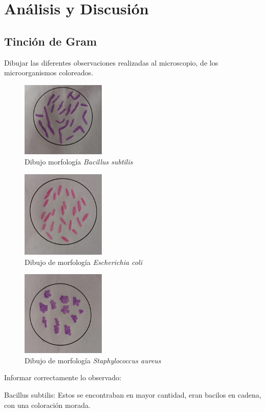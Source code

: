 \documentclass[journal,transmag]{IEEEtran}
\begin{document}
\section{Análisis y Discusión}
\subsection{\textbf{Tinción de Gram}}
 Dibujar las diferentes observaciones realizadas al microscopio, de los microorganismos coloreados. 
 	\begin{figure}[!h] 
	\center 
	\includegraphics[width=4cm]{I27.png} 
	\caption{Dibujo morfología \textit{Bacillus subtilis} } 
	\label{I1}
	\end{figure} 
	\begin{figure}[!h] 
	\center 
	\includegraphics[width=4cm]{I28.png} 
	\caption{Dibujo de morfología \textit{Escherichia coli}} 
	\label{I1}
	\end{figure} 
	\begin{figure}[!h] 
	\center 
	\includegraphics[width=4cm]{I29.png} 
	\caption{Dibujo de morfología \textit{Staphylococcus aureus} } 
	\label{I1}
	\end{figure} 


 Informar correctamente lo observado: 

Bacillus subtilis: Estos se encontraban en mayor cantidad, eran bacilos en cadena, con una coloración morada. 
\end{document}
